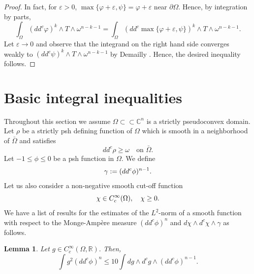 \documentclass{amsart}
\renewcommand{\d}{\partial}
\newcommand{\veps}{\varepsilon}
\newcommand{\vphi}{\varphi}
\newcommand{\ga}{\gamma}
\newcommand{\om}{\omega}
\newcommand{\Om}{\Omega}
\newcommand{\bR}{\mathbb{R}}
\newcommand{\bC}{\mathbb{C}}
\newtheorem{lem}[thm]{Lemma}
\theoremstyle{definition}
\numberwithin{thm}{section}
\numberwithin{equation}{section}
\renewcommand{\[}{\begin{equation}}
\renewcommand{\]}{\end{equation}}
\newcommand{\wed}{\wedge}
\begin{document}
\begin{proof}
In fact, for $\veps>0$,  $\max\{\vphi+\veps, \psi\} = \vphi+\veps$ near $\d\Om$. Hence, by integration by parts,
$$
	\int_\Om (dd^c \vphi)^k \wed T \wed \om^{n-k-1} = \int_\Om (dd^c\max\{\vphi+\veps, \psi\})^k \wed T \wed \om^{n-k-1}.
$$
Let $\veps \to 0$ and observe that the integrand on the right hand side converges weakly to $(dd^c \psi)^k \wed T\wed \om^{n-k-1}$ by  Demailly \cite[Theorem~1.7]{De89}. Hence, the desired inequality follows.
\end{proof}

\section{Basic integral inequalities}
\label{sec:int}
Throughout this section we assume $\Om \subset \subset \bC^n$  is a  strictly pseudoconvex domain. Let $\rho$ be a strictly psh  defining function of $\Om$ which is smooth in a neighborhood of $\bar\Om$ and satisfies
$$ 
	dd^c \rho \geq \om \quad \text{on }\bar \Om. 
$$
Let $-1 \leq \phi \leq 0$ be a psh function in $\Om$. We define
\[\notag
	\ga:= (dd^c\phi)^{n-1}.
\]
Let us also consider a non-negative smooth cut-off function
\[\notag
	\chi \in C^\infty_c(\Om), \quad \chi \geq 0.
\]
We have a list of results for the estimates of the $L^2$-norm of a smooth function with respect to the Monge-Amp\`ere measure $(dd^c \phi)^n$ and $d\chi \wed d^c \chi \wed \ga$ as follows.

\begin{lem}\label{lem:basic-grad} Let $ g \in C_c^\infty(\Om,\bR)$. Then,
$$
	\int g^2 (dd^c \phi)^n \leq 10 \int dg \wed d^c g\wed (dd^c\phi)^{n-1}.
$$
\end{lem}
\end{document}
